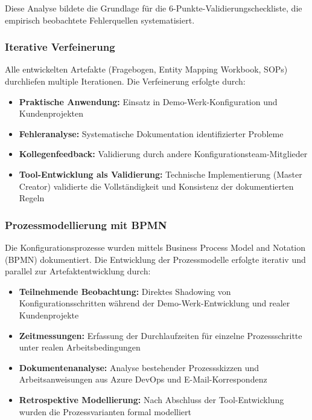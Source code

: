 Diese Analyse bildete die Grundlage für die 6-Punkte-Validierungscheckliste, die empirisch beobachtete Fehlerquellen systematisiert.

\subsubsection{Iterative Verfeinerung}
\label{subsubsec:IterativeVerfeinerung}

Alle entwickelten Artefakte (Fragebogen, Entity Mapping Workbook, SOPs) durchliefen multiple Iterationen. Die Verfeinerung erfolgte durch:

\begin{itemize}
    \item \textbf{Praktische Anwendung:} Einsatz in Demo-Werk-Konfiguration und Kundenprojekten
    \item \textbf{Fehleranalyse:} Systematische Dokumentation identifizierter Probleme
    \item \textbf{Kollegenfeedback:} Validierung durch andere Konfigurationsteam-Mitglieder
    \item \textbf{Tool-Entwicklung als Validierung:} Technische Implementierung (Master Creator) validierte die Vollständigkeit und Konsistenz der dokumentierten Regeln
\end{itemize}

\subsubsection{Prozessmodellierung mit BPMN}
\label{subsubsec:Prozessmodellierung}

Die Konfigurationsprozesse wurden mittels Business Process Model and Notation (BPMN) dokumentiert. Die Entwicklung der Prozessmodelle erfolgte iterativ und parallel zur Artefaktentwicklung durch:

\begin{itemize}
    \item \textbf{Teilnehmende Beobachtung:} Direktes Shadowing von Konfigurationsschritten während der Demo-Werk-Entwicklung und realer Kundenprojekte
    \item \textbf{Zeitmessungen:} Erfassung der Durchlaufzeiten für einzelne Prozessschritte unter realen Arbeitsbedingungen
    \item \textbf{Dokumentenanalyse:} Analyse bestehender Prozessskizzen und Arbeitsanweisungen aus Azure DevOps und E-Mail-Korrespondenz
    \item \textbf{Retrospektive Modellierung:} Nach Abschluss der Tool-Entwicklung wurden die Prozessvarianten formal modelliert
\end{itemize}

